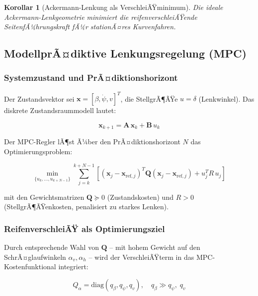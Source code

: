 ﻿\documentclass[12pt,a4paper]{article}
\newtheorem{corollary}[theorem]{Korollar}
\theoremstyle{definition}
\theoremstyle{remark}
\begin{document}
\begin{corollary}[Ackermann-Lenkung als VerschleiÃŸminimum]
Die ideale Ackermann-Lenkgeometrie minimiert die reifenverschleiÃŸende
SeitenfÃ¼hrungskraft fÃ¼r stationÃ¤res Kurvenfahren.
\end{corollary}

\subsection{ModellprÃ¤diktive Lenkungsregelung (MPC)}

\subsubsection{Systemzustand und PrÃ¤diktionshorizont}

Der Zustandsvektor sei $\mathbf{x} = [\beta, \dot{\psi}, v]^T$, die StellgrÃ¶ÃŸe
$u = \delta$ (Lenkwinkel). Das diskrete Zustandsraummodell lautet:

\begin{equation}
  \mathbf{x}_{k+1} = \mathbf{A}\,\mathbf{x}_k + \mathbf{B}\,u_k
  \label{eq:state_space}
\end{equation}

Der MPC-Regler lÃ¶st Ã¼ber den PrÃ¤diktionshorizont $N$ das Optimierungsproblem:

\begin{equation}
  \min_{\{u_k, \ldots, u_{k+N-1}\}} \sum_{j=k}^{k+N-1}
    \left[(\mathbf{x}_j - \mathbf{x}_{\mathrm{ref},j})^T \mathbf{Q}
    (\mathbf{x}_j - \mathbf{x}_{\mathrm{ref},j}) + u_j^T R\, u_j\right]
  \label{eq:mpc}
\end{equation}

mit den Gewichtsmatrizen $\mathbf{Q} \succeq 0$ (Zustandskosten) und
$R > 0$ (StellgrÃ¶ÃŸenkosten, penalisiert zu starkes Lenken).

\subsubsection{ReifenverschleiÃŸ als Optimierungsziel}

Durch entsprechende Wahl von $\mathbf{Q}$ -- mit hohem Gewicht auf den
SchrÃ¤glaufwinkeln $\alpha_v, \alpha_h$ -- wird der VerschleiÃŸterm in das
MPC-Kostenfunktional integriert:

\begin{equation}
  Q_{\alpha} = \text{diag}(q_\beta, q_{\dot\psi}, q_v), \quad
  q_\beta \gg q_{\dot\psi},\; q_v
  \label{eq:q_weights}
\end{equation}
\end{document}
